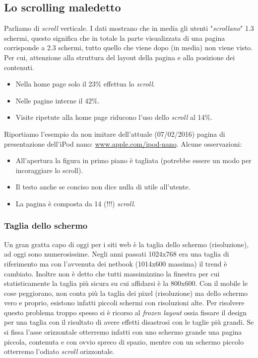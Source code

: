 		
		\subsection{Lo scrolling maledetto}
			Parliamo di \emph{scroll} verticale. I dati mostrano che in media gli utenti "\emph{scrollano}" 1.3 schermi, questo significa che in totale la parte visualizzata di una pagina corrisponde a 2.3 schermi, tutto quello che viene dopo (in media) non viene visto. Per cui, attenzione alla struttura del layout della pagina e alla posizione dei contenuti.
			\begin{itemize}
				\item Nella home page solo il 23\% effettua lo \emph{scroll}.
				\item Nelle pagine interne il 42\%.
				\item Visite ripetute alla home page riducono l'uso dello \emph{scroll} al 14\%.
			\end{itemize}
			Riportiamo l'esempio da non imitare dell'attuale (07/02/2016) pagina di presentazione dell'iPod nano: \href{http://www.apple.com/it/ipod-nano/}{www.apple.com/ipod-nano}. Alcune osservazioni:
			\begin{itemize}
				\item All'apertura la figura in primo piano è tagliata (potrebbe essere un modo per incoraggiare lo scroll).
				\item Il testo anche se conciso non dice nulla di utile all'utente.
				\item La pagina è composta da 14 (!!!) \emph{scroll}.
			\end{itemize}
			
			\subsubsection{Taglia dello schermo}
				Un gran gratta capo di oggi per i siti web è la taglia dello schermo (risoluzione), ad oggi sono numerosissime. Negli anni passati 1024x768 era una taglia di riferimento ma con l'avvenuta dei netbook (1014x600 massima) il trend è cambiato. Inoltre non è detto che tutti massimizzino la finestra per cui statisticamente la taglia più sicura su cui affidarsi è la 800x600. Con il mobile le cose peggiorano, non conta più la taglia dei pixel (risoluzione) ma dello schermo vero e proprio, esistono infatti piccoli schermi con risoluzioni alte.
				Per risolvere questo problema troppo spesso si è ricorso al \emph{frozen layout} ossia fissare il design per una taglia con il risultato di avere effetti disastrosi con le taglie più grandi. Se si fissa l'asse orizzontale otterremo infatti con uno schermo grande una pagina piccola, contenuta e con ovvio spreco di spazio, mentre con un schermo piccolo otterremo l'odiato \emph{scroll} orizzontale.
				
